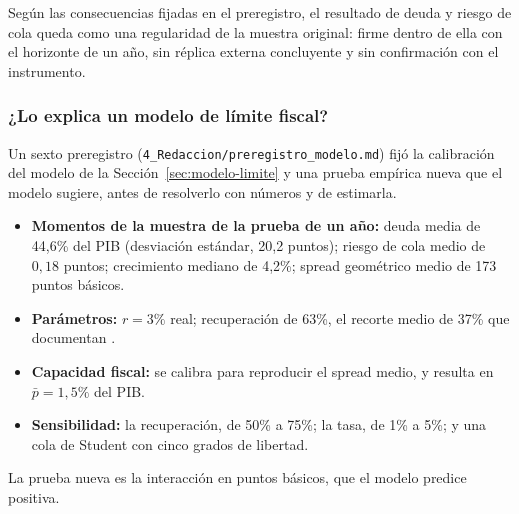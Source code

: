 Según las consecuencias fijadas en el preregistro, el resultado de deuda y riesgo de cola queda como una regularidad de la muestra original: firme dentro de ella con el horizonte de un año, sin réplica externa concluyente y sin confirmación con el instrumento.

\subsubsection{¿Lo explica un modelo de límite fiscal?}
\label{sec:modelo-resultados}

Un sexto preregistro (\texttt{4\_Redaccion/preregistro\_modelo.md}) fijó la calibración del modelo de la Sección~\ref{sec:modelo-limite} y una prueba empírica nueva que el modelo sugiere, antes de resolverlo con números y de estimarla.
\begin{itemize}
    \item \textbf{Momentos de la muestra de la prueba de un año:} deuda media de 44,6\% del PIB (desviación estándar, 20,2 puntos); riesgo de cola medio de $0{,}18$ puntos; crecimiento mediano de 4,2\%; spread geométrico medio de 173 puntos básicos.
    \item \textbf{Parámetros:} $r=3\%$ real; recuperación de 63\%, el recorte medio de 37\% que documentan \citet{CrucesTrebesch2013}.
    \item \textbf{Capacidad fiscal:} se calibra para reproducir el spread medio, y resulta en $\bar p=1{,}5\%$ del PIB.
    \item \textbf{Sensibilidad:} la recuperación, de 50\% a 75\%; la tasa, de 1\% a 5\%; y una cola de Student con cinco grados de libertad.
\end{itemize}
La prueba nueva es la interacción en puntos básicos, que el modelo predice positiva.

